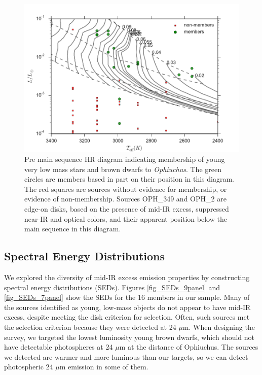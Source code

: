 \begin{landscape}
	
\end{landscape}

\begin{figure}[ht!]
  \caption[Pre main sequence HR diagram with young very low mass stars and brown dwarfs]{Pre main sequence HR diagram indicating membership of young very low mass stars and brown dwarfs to \emph{Ophiuchus}.  The green circles are members based in part on their position in this diagram.  The red squares are sources without evidence for membership, or evidence of non-membership.  Sources OPH\_349 and OPH\_2 are edge-on disks, based on the presence of mid-IR excess, suppressed near-IR and optical colors, and their apparent position below the main sequence in this diagram. \label{fig_HRD_NaI_Ex} }
\centering
\includegraphics[scale=0.6]{chIMACS/figures/HRD_zoom.pdf}
\end{figure}

\subsection{Spectral Energy Distributions}
\label{sec_SED}

We explored the diversity of mid-IR excess emission properties by constructing spectral energy distributions (SEDs).  Figures \ref{fig_SEDs_9panel} and \ref{fig_SEDs_7panel} show the SEDs for the 16 members in our sample.  Many of the sources identified as young, low-mass objects do not appear to have mid-IR excess, despite meeting the disk criterion for selection.  Often, such sources met the selection criterion because they were detected at 24 $\mu$m.  When designing the survey, we targeted the lowest luminosity young brown dwarfs, which should not have detectable photospheres at 24 $\mu$m at the distance of Ophiuchus.  The sources we detected are warmer and more luminous than our targets, so we can detect photospheric 24 $\mu$m emission in some of them.

